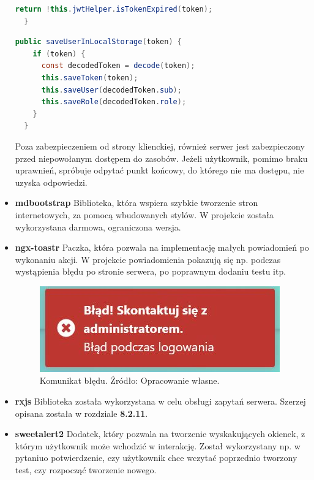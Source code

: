 \documentclass[twoside]{projektInzynierskiMS}
\numberwithin{figure}{section}
\begin{document}
\begin{itemize}
\begin{lstlisting}[language=Java,caption=Implementacja sprawdzenia poprawności tokenu oraz jego ważności. Źródło: Opracowanie własne.,captionpos=b]
    return !this.jwtHelper.isTokenExpired(token);
  }
\end{lstlisting}

\begin{lstlisting}[language=Java,caption=Pobranie nazwy użytkownika i przypisanej roli do localStorage. Źródło: Opracowanie własne.,captionpos=b]
  public saveUserInLocalStorage(token) {
    if (token) {
      const decodedToken = decode(token);
      this.saveToken(token);
      this.saveUser(decodedToken.sub);
      this.saveRole(decodedToken.role);
    }
  }
\end{lstlisting}
Poza zabezpieczeniem od strony klienckiej, również serwer jest zabezpieczony przed niepowołanym dostępem do zasobów. Jeżeli użytkownik, pomimo braku uprawnień, spróbuje odpytać punkt końcowy, do którego nie ma dostępu, nie uzyska odpowiedzi.

\item \textbf{mdbootstrap}\newline
Biblioteka, która wspiera szybkie tworzenie stron internetowych, za pomocą wbudowanych stylów. W projekcie została wykorzystana darmowa, ograniczona wersja.

\item \textbf{ngx-toastr}\newline
Paczka, która pozwala na implementację małych powiadomień po wykonaniu akcji. W projekcie powiadomienia pokazują się np. podczas wystąpienia błędu po stronie serwera, po poprawnym dodaniu testu itp.

    \begin{figure}[h!]
        \centering
        \includegraphics[scale=0.8]{images/toastError.JPG}
        \caption{Komunikat błędu. Źródło: Opracowanie własne.}
        \label{fig:toast_error}
    \end{figure}
    
\item \textbf{rxjs}\newline
Biblioteka została wykorzystana w celu obsługi zapytań serwera. Szerzej opisana została w rozdziale \textbf{8.2.11}.

\item \textbf{sweetalert2}\newline
Dodatek, który pozwala na tworzenie wyskakujących okienek, z którym użytkownik może wchodzić w interakcję. Został wykorzystany np. w pytaniu\linebreak o potwierdzenie, czy użytkownik chce wczytać poprzednio tworzony test, czy rozpocząć tworzenie nowego.


\end{itemize}
\end{document}
